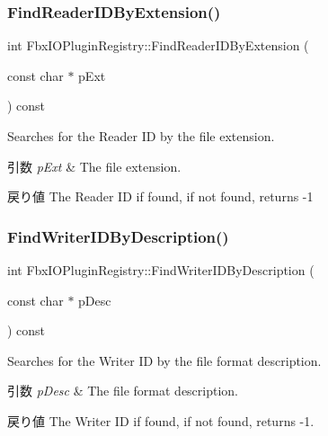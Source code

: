 \subsubsection{\texorpdfstring{Find\+Reader\+I\+D\+By\+Extension()}{FindReaderIDByExtension()}}
{\footnotesize\ttfamily int Fbx\+I\+O\+Plugin\+Registry\+::\+Find\+Reader\+I\+D\+By\+Extension (\begin{DoxyParamCaption}\item[{const char $\ast$}]{p\+Ext }\end{DoxyParamCaption}) const}

Searches for the Reader ID by the file extension. 
\begin{DoxyParams}{引数}
{\em p\+Ext} & The file extension. \\
\hline
\end{DoxyParams}
\begin{DoxyReturn}{戻り値}
The Reader ID if found, if not found, returns -\/1 
\end{DoxyReturn}
\mbox{\label{class_fbx_i_o_plugin_registry_afb8a3db5c0234b9a275be784b75e5748}} 
\subsubsection{\texorpdfstring{Find\+Writer\+I\+D\+By\+Description()}{FindWriterIDByDescription()}}
{\footnotesize\ttfamily int Fbx\+I\+O\+Plugin\+Registry\+::\+Find\+Writer\+I\+D\+By\+Description (\begin{DoxyParamCaption}\item[{const char $\ast$}]{p\+Desc }\end{DoxyParamCaption}) const}

Searches for the Writer ID by the file format description. 
\begin{DoxyParams}{引数}
{\em p\+Desc} & The file format description. \\
\hline
\end{DoxyParams}
\begin{DoxyReturn}{戻り値}
The Writer ID if found, if not found, returns -\/1. 
\end{DoxyReturn}
\mbox{\label{class_fbx_i_o_plugin_registry_ad9495307df7b5dc61ceb34d940f6d619}} 
